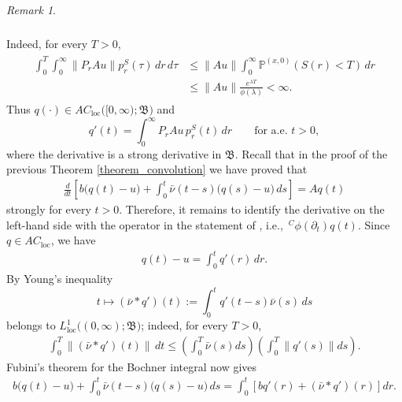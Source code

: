 \documentclass[reqno]{amsart}
\theoremstyle{remark}
\newtheorem{remark}[theorem]{Remark}
\numberwithin{equation}{section} %
\newcommand{\1}{\mathds{1}}
\begin{document}
\begin{remark}
\begin{align}
\begin{aligned}
			\end{aligned}
		\end{align}
		Indeed, for every $T>0$,
		\begin{align}
			\begin{aligned}
				\int_0^T
				\int_0^\infty
				\|P_rAu\|p_r^S(\tau)\,dr\,d\tau
				&\leq
				\|Au\|
				\int_0^\infty \mathds{P}^{(x,0)} (S(r) < T)\,dr\\
				&\leq
				\|Au\|
				\frac{e^{\lambda T}}{\phi(\lambda)}
				<\infty.
			\end{aligned}
		\end{align}
		Thus $q(\cdot)\in AC_{\mathrm{loc}}
		\bigl([0,\infty);\mathfrak B\bigr)$
		and
		\begin{equation}
			q'(t)
			=
			\int_0^\infty P_rAu\,p_r^S(t)\,dr
			\qquad\text{for a.e. }t>0,
		\end{equation}
		where the derivative is a strong derivative in $\mathfrak B$.
		Recall that in the proof of the previous Theorem \ref{theorem_convolution} we have proved that
		\begin{align}\label{457}
			\frac{d}{dt}
			\left[
			b\bigl(q(t)-u\bigr)
			+
			\int_0^t
			\bar{\nu}(t-s)\bigl(q(s)-u\bigr)\,ds
			\right]
			=
			Aq(t)
		\end{align}
		strongly for every $t>0$.
		Therefore, it remains to identify the  derivative on the left-hand side with the operator in the
		statement of \cite[Theorem 5.1]{toaldo_pota}, i.e., $\,^C\phi(\partial_t)q(t)$. Since $q\in AC_{\mathrm{loc}}$, we have
		\begin{align}
			q(t)-u=\int_0^t q'(r)\,dr.
		\end{align}
		By Young's inequality \cite[Proposition 1.3.2]{arendt2001cauchy}
		\begin{equation}
			t\longmapsto
			(\bar{\nu}*q')(t)
			:=
			\int_0^t q'(t-s)\bar{\nu}(s)\,ds
		\end{equation}
		belongs to
		$L^1_{\mathrm{loc}}\bigl((0,\infty);\mathfrak B\bigr)$;
		indeed, for every $T>0$,
		\begin{align}
			\int_0^T\|(\bar{\nu}*q')(t)\|\,dt \leq \left( \int_0^T \bar{\nu}(s) ds \right) \left(
			\int_0^T \left\| q'(s) \right\| ds \right) . 
		\end{align}
		Fubini's theorem for the Bochner integral now gives 
		\begin{align}
			b\bigl(q(t)-u\bigr) +  \int_0^t
			\bar{\nu}(t-s)\bigl(q(s)-u\bigr)\,ds = \int_0^t
			\left[ bq'(r)+(\bar{\nu}*q')(r)
			\right]dr.
			\label{dinnertime}
		\end{align}

\end{remark}
\end{document}
